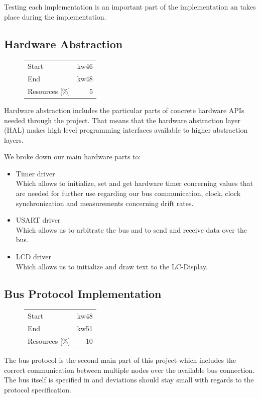 Testing each implementation is an important part of the implementation an takes place during the implementation.

\subsection{Hardware Abstraction}
\begin{figure}
\begin{tabular}[t]{|lr|}
\hline
Start & kw46\\
End & kw48\\
Resources [\%] & 5\\
\hline
\end{tabular}
\end{figure}
Hardware abstraction includes the particular parts of concrete hardware APIs needed through the project. 
That means that the hardware abstraction layer (HAL) makes high level programming interfaces available to 
higher abstraction layers.

We broke down our main hardware parts to:
\begin{itemize}
 \item Timer driver\\
Which allows to initialize, set and get hardware timer concerning values that are needed
for further use regarding our bus communication, clock, clock synchronization and 
measurements concerning drift rates.
 \item USART driver\\
Which allows us to arbitrate the bus and to send and receive data over the bus.
 \item LCD driver\\
Which allows us to initialize and draw text to the LC-Display.
\end{itemize}

\subsection{Bus Protocol Implementation}
\begin{figure}
\begin{tabular}[t]{|lr|}
\hline
Start & kw48\\
End & kw51\\
Resources [\%] & 10\\
\hline
\end{tabular}
\end{figure}
The bus protocol is the second main part of this project which includes the correct communication
between multiple nodes over the available bus connection. 
The bus itself is specified in \cite [NESD2]{NESD2} and deviations should stay small with regards to  
the protocol specification.

